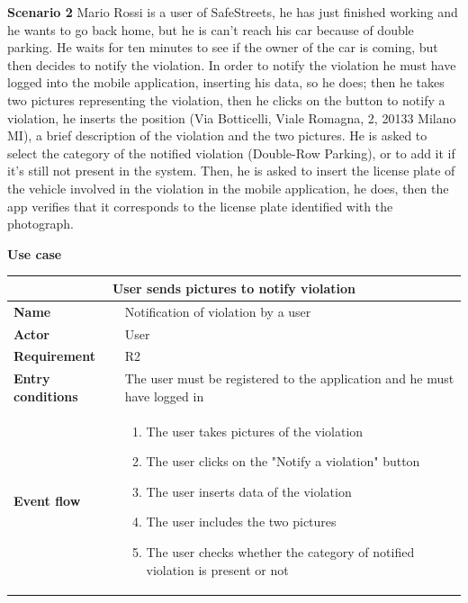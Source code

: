 \begin{description}
    \item \textbf{Scenario 2} \newline
        Mario Rossi is a user of SafeStreets, he has just finished working and he wants to go back home, but he is can't reach his car because of double parking. He waits for ten 
        minutes to see if the owner of the car is coming, but then decides to notify the violation. In order to notify the violation he must have logged into the mobile application, inserting his data, so he does; then he takes two pictures representing the violation, 
        then he clicks on the button to notify a violation, he inserts the position (Via Botticelli, Viale Romagna, 2, 20133 Milano MI), a brief description 
        of the violation and the two pictures. He is asked to select the category of the notified violation (Double-Row Parking), or to add it if it's still not present in the system.
        Then, he is asked to insert the license plate of the vehicle involved in the violation in the mobile application, he does, then the app verifies that it 
        corresponds to the license plate identified with the photograph.
    \item \textbf{Use case}
    \begin{center}
        \begin{tabular}{|p{3cm}|p{7cm}|}
            \multicolumn{2}{c}{\textbf{User sends pictures to notify violation}} \\
            \hline
            \textbf{Name} & Notification of violation by a user \\
            \hline
            \textbf{Actor} & User \\
            \hline
            \textbf{Requirement} & R2 \\
            \hline
            \textbf{Entry conditions} & The user must be registered to the application and he must have logged in \\
            \hline
            \textbf{Event flow} &
            \begin{enumerate}
                \item The user takes pictures of the violation
                \item The user clicks on the "Notify a violation" button
                \item The user inserts data of the violation
                \item The user includes the two pictures 
                \item The user checks whether the category of notified violation is present or not

\end{enumerate}
\end{tabular}
\end{center}
\end{description}
